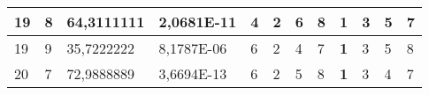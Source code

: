 \documentclass[conference]{IEEEtran}
\begin{document}
\begin{table*}[]
\begin{tabular}{|llll|llllllll|}
\multicolumn{1}{|l|}{19}                                                    & \multicolumn{1}{l|}{8}                                                        & \multicolumn{1}{l|}{64,3111111}                                                   & 2,0681E-11                     & \multicolumn{1}{l|}{4}                                                  & \multicolumn{1}{l|}{2}                                                  & \multicolumn{1}{l|}{6}                                                  & \multicolumn{1}{l|}{8}                                                  & \multicolumn{1}{l|}{\textbf{1}}                                         & \multicolumn{1}{l|}{3}                                                  & \multicolumn{1}{l|}{5}                                                  & 7                          \\ \hline
\multicolumn{1}{|l|}{19}                                                    & \multicolumn{1}{l|}{9}                                                        & \multicolumn{1}{l|}{35,7222222}                                                   & 8,1787E-06                     & \multicolumn{1}{l|}{6}                                                  & \multicolumn{1}{l|}{2}                                                  & \multicolumn{1}{l|}{4}                                                  & \multicolumn{1}{l|}{7}                                                  & \multicolumn{1}{l|}{\textbf{1}}                                         & \multicolumn{1}{l|}{3}                                                  & \multicolumn{1}{l|}{5}                                                  & 8                          \\ \hline
\multicolumn{1}{|l|}{20}                                                    & \multicolumn{1}{l|}{7}                                                        & \multicolumn{1}{l|}{72,9888889}                                                   & 3,6694E-13                     & \multicolumn{1}{l|}{6}                                                  & \multicolumn{1}{l|}{2}                                                  & \multicolumn{1}{l|}{5}                                                  & \multicolumn{1}{l|}{8}                                                  & \multicolumn{1}{l|}{\textbf{1}}                                         & \multicolumn{1}{l|}{3}                                                  & \multicolumn{1}{l|}{4}                                                  & 7                          \\ \hline

\end{tabular}
\end{table*}
\end{document}
